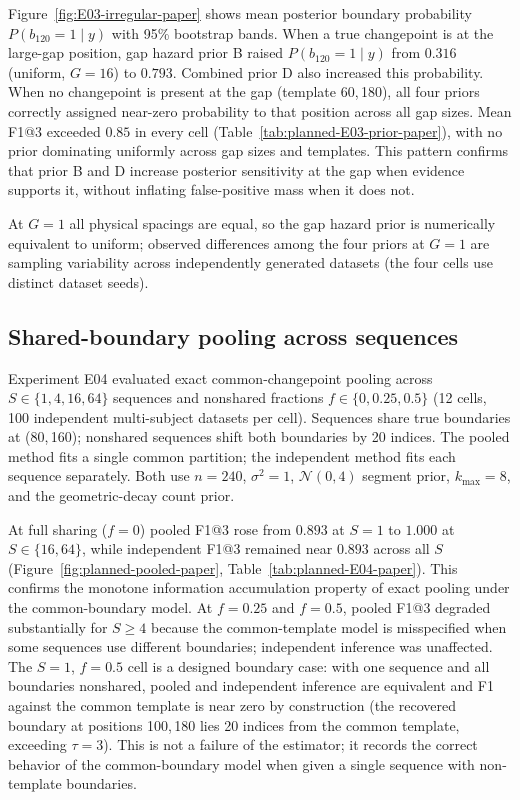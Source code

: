 Figure~\ref{fig:E03-irregular-paper} shows mean posterior boundary probability $P(b_{120}=1\mid y)$ with 95\% bootstrap bands. When a true changepoint is at the large-gap position, gap hazard prior B raised $P(b_{120}=1\mid y)$ from $0.316$ (uniform, $G=16$) to $0.793$. Combined prior D also increased this probability. When no changepoint is present at the gap (template 60,\,180), all four priors correctly assigned near-zero probability to that position across all gap sizes. Mean F1@3 exceeded $0.85$ in every cell (Table~\ref{tab:planned-E03-prior-paper}), with no prior dominating uniformly across gap sizes and templates. This pattern confirms that prior B and D increase posterior sensitivity at the gap when evidence supports it, without inflating false-positive mass when it does not.

At $G=1$ all physical spacings are equal, so the gap hazard prior is numerically equivalent to uniform; observed differences among the four priors at $G=1$ are sampling variability across independently generated datasets (the four cells use distinct dataset seeds).





\FloatBarrier
\subsection{Shared-boundary pooling across sequences}
Experiment E04 evaluated exact common-changepoint pooling across $S\in\{1,4,16,64\}$ sequences and nonshared fractions $f\in\{0,0.25,0.5\}$ (12 cells, 100 independent multi-subject datasets per cell). Sequences share true boundaries at (80,\,160); nonshared sequences shift both boundaries by 20 indices. The pooled method fits a single common partition; the independent method fits each sequence separately. Both use $n=240$, $\sigma^2=1$, $\mathcal{N}(0,4)$ segment prior, $k_{\max}=8$, and the geometric-decay count prior.

At full sharing ($f=0$) pooled F1@3 rose from $0.893$ at $S=1$ to $1.000$ at $S\in\{16,64\}$, while independent F1@3 remained near $0.893$ across all $S$ (Figure~\ref{fig:planned-pooled-paper}, Table~\ref{tab:planned-E04-paper}). This confirms the monotone information accumulation property of exact pooling under the common-boundary model. At $f=0.25$ and $f=0.5$, pooled F1@3 degraded substantially for $S\geq4$ because the common-template model is misspecified when some sequences use different boundaries; independent inference was unaffected. The $S=1$, $f=0.5$ cell is a designed boundary case: with one sequence and all boundaries nonshared, pooled and independent inference are equivalent and F1 against the common template is near zero by construction (the recovered boundary at positions 100,\,180 lies 20 indices from the common template, exceeding $\tau=3$). This is not a failure of the estimator; it records the correct behavior of the common-boundary model when given a single sequence with non-template boundaries.

